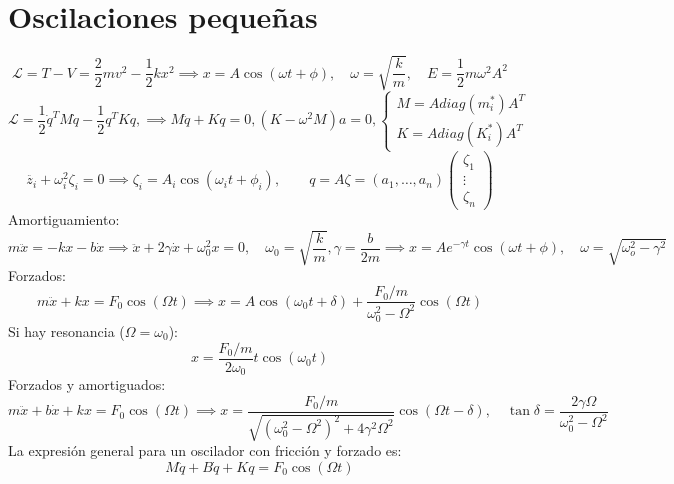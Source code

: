 \documentclass[leqno]{article}
\newcommand{\1}{\tikz[baseline=(char.base)]{
            \node[shape=circle,draw,inner sep=1pt] (char) {1};}}
\newcommand{\2}{\tikz[baseline=(char.base)]{
            \node[shape=circle,draw,inner sep=1pt] (char) {2};}}
\renewcommand{\L}{\mathcal{L}}
\begin{document}
 \section{Oscilaciones pequeñas}
 $$
  \L = T-V = \frac{2}{2}mv^2 - \frac{1}{2}kx^2 \implies x = A\cos(\omega t + \phi),\quad \omega = \sqrt{\frac{k}{m}}, \quad E = \frac{1}{2} m\omega^2 A^2
 $$
 \[
 \L = \frac{1}{2} \dot{q}^T M \dot{q} - \frac{1}{2} q^T K q, \implies M \ddot{q} + Kq = 0, (K-\omega^2 M)a = 0, \begin{cases}
   M = Adiag(m^*_i)A^T \\
   K = Adiag(K^*_i)A^T 
 \end{cases}
 \] 
\[
\ddot{z_i} + \omega_i^2 \zeta_i = 0 \implies \zeta_i = A_i\cos(\omega_it + \phi_i), \qquad q = A\zeta = (a_1, \ldots, a_n)\begin{pmatrix} \zeta_1 \\ \vdots \\ \zeta_n \end{pmatrix} 
\] 
Amortiguamiento:
\[
m\ddot{x} = -kx -b \dot{x} \implies \ddot{x} + 2 \gamma \dot{x} + \omega_0^2x = 0, \quad \omega_0 = \sqrt{\frac{k}{m}}, \gamma = \frac{b}{2m} \implies x = Ae^{-\gamma t}\cos(\omega t+ \phi), \quad \omega = \sqrt{\omega_o^2 - \gamma^2} 
\] 
Forzados:
 \[
m \ddot{x} + kx = F_0\cos(\Omega t) \implies x =  A\cos(\omega_0 t + \delta)  + \frac{F_0 / m}{\omega_0^2 -\Omega^2}\cos(\Omega t)
\] 
Si hay resonancia ($\Omega = \omega_0$):
\[
x = \frac{F_0/m}{2\omega_0}t\cos(\omega_0t)
\] 
Forzados y amortiguados:
 \[
m \ddot{x} +b\dot{x}+ kx = F_0\cos(\Omega t) \implies x =  \frac{F_0/m}{\sqrt{(\omega_0^2-\Omega^2)^2 + 4\gamma^2\Omega^2}} \cos(\Omega t - \delta), \quad \tan \delta = \frac{2\gamma \Omega}{\omega_0^2 - \Omega^2}
\] 
La expresión general para un oscilador con fricción y forzado es:
 \[
M\ddot{q} + B\dot{q} + Kq = F_0\cos(\Omega t)
\] 
\end{document}
